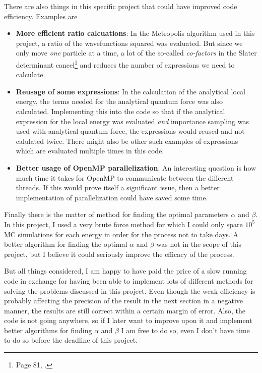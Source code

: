There are also things in this specific project that could have improved code efficiency. Examples are

\begin{itemize}
	\item \textbf{More efficient ratio calcuations}:
	In the Metropolis algorithm used in this project, a ratio of the wavefunctions squared was evaluated. 
	But since we only move \textit{one} particle at a time, a lot of the so-called \textit{co-factors} in the Slater determinant cancel\footnote{Page 81, \cite{master}.} and reduces the number of expressions we need to calculate. 
	\item \textbf{Reusage of some expressions}:
	In the calculation of the analytical local energy, the terms needed for the analytical quantum force was also calculated. Implementing this into the code so that if the analytical expression for the local energy was evaluated \textit{and} importance sampling was used with analytical quantum force, the expressions would reused and not calulated twice. 
	There might also be other such examples of expressions which are evaluated multiple times in this code.
	\item \textbf{Better usage of OpenMP parallelization}:
	An interesting question is how much time it takes for OpenMP to communicate between the different threads.
	If this would prove itself a significant issue, then a better implementation of parallelization could have saved some time. 
\end{itemize}

Finally there is the matter of method for finding the optimal parameters $\alpha$ and $\beta$. 
In this project, I used a very brute force method for which I could only spare $10^5$ MC simulations for each energy in order for the process not to take days. 
A better algorithm for finding the optimal $\alpha$ and $\beta$ was not in the scope of this project, but I believe it could seriously improve the efficacy of the process.

But all things considered, I am happy to have paid the price of a slow running code in exchange for having been able to implement lots of different methods for solving the problems discussed in this project. 
Even though the weak efficiency is probably affecting the precision of the result in the next section in a negative manner, the results are still correct within a certain margin of error.
Also, the code is not going anywhere, so if I later want to improve upon it and implement better algorithms for finding $\alpha$ and $\beta$ I am free to do so, even I don't have time to do so before the deadline of this project. 















